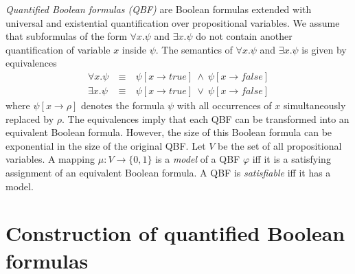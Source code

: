 \documentclass[a4paper,UKenglish,cleveref,autoref,thm-restate]{lipics-v2021}
\def\false{\mathit{false}}
\def\true{\mathit{true}}
\begin{document}
\bigskip

\emph{Quantified Boolean formulas (QBF)} are Boolean formulas
extended with universal and existential quantification over
propositional variables. We assume that subformulas of the form
$\forall x.\psi$ and $\exists x.\psi$ do not contain another
quantification of variable $x$ inside $\psi$. The semantics of
$\forall x.\psi$ and $\exists x.\psi$ is given by equivalences
\[
  \begin{array}{rcl}
    \forall x.\psi &~\equiv~& \psi[x\rightarrow\true]~\wedge~\psi[x\rightarrow\false]\\
    \exists x.\psi &~\equiv~& \psi[x\rightarrow\true]~\vee~   \psi[x\rightarrow\false]
  \end{array}
\]
where $\psi[x\rightarrow \rho]$ denotes the formula $\psi$ with all
occurrences of $x$ simultaneously replaced by $\rho$. The equivalences
imply that each QBF can be transformed into an equivalent Boolean
formula. However, the size of this Boolean formula can be exponential
in the size of the original QBF. Let $V$ be the set of all
propositional variables. A mapping $\mu:V\rightarrow\{0,1\}$
is a \emph{model} of a QBF $\varphi$ iff it is a satisfying
assignment of an equivalent Boolean formula. A QBF is
\emph{satisfiable} iff it has a model.



\section{Construction of quantified Boolean formulas}\label{sec:qbf}
\end{document}
